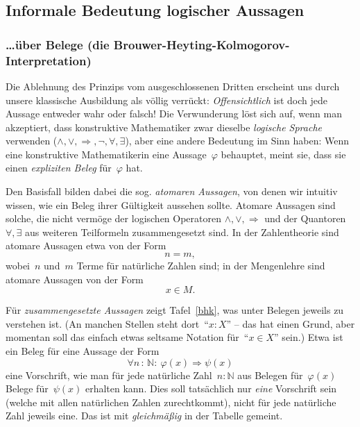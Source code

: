 \documentclass[a4paper,ngerman,12pt]{scrartcl}
\theoremstyle{definition}
\theoremstyle{plain}
\theoremstyle{remark}
\newcommand{\NN}{\mathbb{N}}
\renewcommand{\_}{\mathpunct{.}\,}
\newcommand{\?}{\,{:}\,}
\begin{document}
\subsection{Informale Bedeutung logischer Aussagen}

\subsubsection*{\ldots über Belege (die
Brouwer-Heyting-Kolmogorov-Interpretation)}

Die Ablehnung des Prinzips vom ausgeschlossenen Dritten erscheint uns durch
unsere klassische Ausbildung als völlig verrückt: \emph{Offensichtlich} ist
doch jede Aussage entweder wahr oder falsch! Die Verwunderung löst sich auf,
wenn man akzeptiert, dass konstruktive Mathematiker zwar dieselbe
\emph{logische Sprache} verwenden ($\wedge, \vee, \Rightarrow, \neg, \forall,
\exists$), aber eine andere Bedeutung im Sinn haben: Wenn eine konstruktive
Mathematikerin eine Aussage~$\varphi$ behauptet, meint sie, dass sie einen
\emph{expliziten Beleg} für~$\varphi$ hat.

Den Basisfall bilden dabei die sog. \emph{atomaren Aussagen}, von denen wir
intuitiv wissen, wie ein Beleg ihrer Gültigkeit aussehen sollte. Atomare Aussagen sind
solche, die nicht vermöge der logischen Operatoren $\wedge, \vee,
\Rightarrow$ und der Quantoren~$\forall, \exists$ aus weiteren Teilformeln
zusammengesetzt sind. In der Zahlentheorie sind atomare Aussagen etwa von der
Form
\[ n = m, \]
wobei~$n$ und~$m$ Terme für natürliche Zahlen sind; in der Mengenlehre sind
atomare Aussagen von der Form
\[ x \in M. \]

Für \emph{zusammengesetzte Aussagen} zeigt Tafel~\ref{bhk}, was unter Belegen
jeweils zu verstehen ist. (An manchen Stellen steht dort~"`$x : X$"' -- das hat
einen Grund, aber momentan soll das einfach etwas seltsame Notation für~"`$x
\in X$"' sein.) Etwa ist ein Beleg für eine Aussage der Form
\[ \forall n \? \NN{:}\ \varphi(x) \Rightarrow \psi(x) \]
eine Vorschrift, wie man für jede natürliche Zahl~$n : \NN$ aus Belegen
für~$\varphi(x)$ Belege für~$\psi(x)$ erhalten kann. Dies soll tatsächlich nur
\emph{eine} Vorschrift sein (welche mit allen natürlichen Zahlen zurechtkommt),
nicht für jede natürliche Zahl jeweils eine. Das ist mit \emph{gleichmäßig} in
der Tabelle gemeint.
\end{document}
